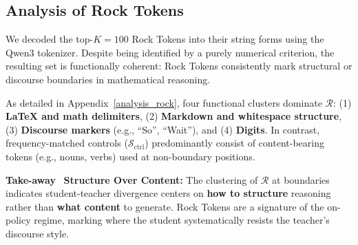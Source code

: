 \subsection{Analysis of Rock Tokens}

We decoded the top-$K{=}100$ Rock Tokens into their string forms using the Qwen3 tokenizer. Despite being identified by a purely numerical criterion, the resulting set is functionally coherent: Rock Tokens consistently mark structural or discourse boundaries in mathematical reasoning. 

As detailed in Appendix~\ref{analysis_rock}, four functional clusters dominate $\mathcal{R}$: (1) \textbf{LaTeX and math delimiters}, (2) \textbf{Markdown and whitespace structure}, (3) \textbf{Discourse markers} (e.g., ``So'', ``Wait''), and (4) \textbf{Digits}. In contrast, frequency-matched controls ($\mathcal{S}_{\text{ctrl}}$) predominantly consist of content-bearing tokens (e.g., nouns, verbs) used at non-boundary positions.

\begin{takeaway}
\textcolor{tabblue}{\textbf{Take-away}}~ \textbf{Structure Over Content:} The clustering of $\mathcal{R}$ at boundaries indicates student-teacher divergence centers on \textbf{how to structure} reasoning rather than \textbf{what content} to generate. Rock Tokens are a signature of the on-policy regime, marking where the student systematically resists the teacher's discourse style.
\end{takeaway}





